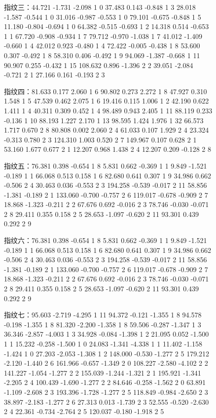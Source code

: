 \documentclass{whutmod}
\begin{document}
\begin{spacing}{1.2}
\begin{figure}[H]
指纹三：44.721 -1.731 -2.098 1 0
37.483 0.143 -0.848 1 3
28.018 -1.587 -0.544 1 0
31.016 -0.987 -0.553 1 0
79.101 -0.675 -0.848 1 5
11.180 -0.804 -0.694 1 0
64.382 -0.515 -0.693 1 2
14.318 0.514 -0.653 1 1
67.720 -0.908 -0.934 1 7
79.712 -0.970 -1.038 1 7
41.012 -1.409 -0.660 1 4
42.012 0.923 -0.480 1 4
72.422 -0.005 -0.438 1 8
53.600 0.307 -0.492 1 8
58.310 0.406 -0.492 1 9
94.069 -1.387 -0.668 1 11
90.907 0.255 -0.432 1 15
108.632 0.896 -1.396 2 2
39.051 -2.084 -0.721 2 1
27.166 0.161 -0.193 2 3

指纹四：81.633 0.177 2.060 1 6
90.802 0.273 2.272 1 8
47.927 0.310 1.548 1 5
47.539 0.462 2.075 1 6
19.416 0.115 1.006 1 2
42.190 0.622 1.411 1 4
40.311 0.309 0.452 1 4
98.489 0.943 2.405 1 11
88.119 0.233 -0.136 1 10
88.193 1.227 2.170 1 13
98.595 1.424 1.976 1 32
66.573 1.717 0.670 2 8
80.808 0.002 2.060 2 4
61.033 0.107 1.929 2 4
23.324 -0.313 0.780 2 3
124.310 1.003 0.520 2 7
149.967 0.107 0.628 2 1
53.160 1.677 0.677 2 1
12.207 0.968 1.438 2 4
12.207 0.209 -0.128 2 8

指纹五：76.381 0.398 -0.654 1 8
5.831 0.662 -0.369 1 1
9.849 -1.521 -0.189 1 1
66.068 0.513 0.158 1 6
82.680 0.641 0.307 1 9
34.986 0.662 -0.506 2 4
30.463 0.036 -0.553 2 3
194.258 -0.539 -0.017 2 11
58.856 -1.381 -0.189 2 1
133.060 -0.700 -0.757 2 6
119.017 -0.678 -0.909 2 7
18.868 -1.323 -0.211 2 2
67.676 0.692 -0.016 2 3
78.746 -0.030 -0.071 2 8
29.411 0.355 0.158 2 5
28.653 -1.097 -0.620 2 11
93.301 0.439 0.292 2 9

指纹六：76.381 0.398 -0.654 1 8
5.831 0.662 -0.369 1 1
9.849 -1.521 -0.189 1 1
66.068 0.513 0.158 1 6
82.680 0.641 0.307 1 9
34.986 0.662 -0.506 2 4
30.463 0.036 -0.553 2 3
194.258 -0.539 -0.017 2 11
58.856 -1.381 -0.189 2 1
133.060 -0.700 -0.757 2 6
119.017 -0.678 -0.909 2 7
18.868 -1.323 -0.211 2 2
67.676 0.692 -0.016 2 3
78.746 -0.030 -0.071 2 8
29.411 0.355 0.158 2 5
28.653 -1.097 -0.620 2 11
93.301 0.439 0.292 2 9


指纹七：95.603 -2.719 -4.295 1 11
94.372 -0.121 -1.355 1 8
94.578 -0.198 -1.355 1 8
81.320 -2.200 -1.358 1 8
59.506 -0.287 -1.347 1 3
36.346 -2.857 -4.003 1 3
34.928 -0.084 -1.398 1 2
21.095 0.052 -1.500 1 1
15.232 -0.258 -1.500 1 0
24.083 -1.341 -4.338 1 1
11.402 -1.158 -1.424 1 0
27.203 -2.053 -1.308 1 2
148.000 -0.530 -1.277 2 5
179.212 -2.120 -1.440 2 6
161.966 -0.657 -1.349 2 0
108.227 -2.580 -4.102 2 2
141.227 -1.054 -1.277 2 2
155.039 -1.244 -1.321 2 1
195.921 -1.341 -2.205 2 4
100.439 -1.690 -1.277 2 2
84.646 -0.258 -1.562 2 0
63.891 -1.109 -2.608 2 3
193.396 -1.728 -1.277 2 5
118.849 -0.984 -2.650 2 3
38.897 -2.183 -1.277 2 6
27.313 0.013 -1.739 2 3
52.555 -0.520 -2.630 2 4
22.361 -0.734 -2.764 2 5
120.037 -0.180 -1.918 2 5



\end{figure}
\end{spacing}
\end{document}
